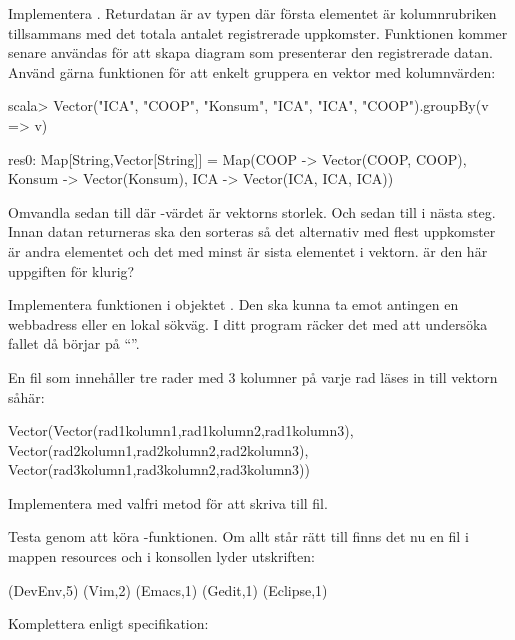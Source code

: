 \Subtask Implementera . Returdatan är av typen  där första elementet är kolumnrubriken tillsammans med det totala antalet registrerade uppkomster. Funktionen kommer senare användas för att skapa diagram som presenterar den registrerade datan. Använd gärna funktionen  för att enkelt gruppera en vektor med kolumnvärden:
\begin{REPLnonum}
scala> Vector("ICA", "COOP", "Konsum", "ICA", "ICA", "COOP").groupBy(v => v)

res0: Map[String,Vector[String]] = Map(COOP -> Vector(COOP, COOP),
                                       Konsum -> Vector(Konsum),
                                       ICA -> Vector(ICA, ICA, ICA))
\end{REPLnonum}
Omvandla sedan  till  där -värdet är vektorns storlek. Och sedan till  i nästa steg. Innan datan returneras ska den sorteras så det alternativ med flest uppkomster är andra elementet och det med minst är sista elementet i vektorn.
\TODO är den här uppgiften för klurig?

\Subtask Implementera funktionen  i objektet . Den ska kunna ta emot antingen en webbadress eller en lokal sökväg. I ditt program räcker det med att undersöka fallet då  börjar på ``''.

En fil som innehåller tre rader med 3 kolumner på varje rad läses in till vektorn såhär:
\begin{CodeSmall}[language=, ]
Vector(Vector(rad1kolumn1,rad1kolumn2,rad1kolumn3),
       Vector(rad2kolumn1,rad2kolumn2,rad2kolumn3),
       Vector(rad3kolumn1,rad3kolumn2,rad3kolumn3))
\end{CodeSmall}

\Subtask Implementera  med valfri metod för att skriva till fil.

\Subtask Testa  genom att köra -funktionen. Om allt står rätt till finns det nu en fil  i mappen resources och i konsollen lyder utskriften:
\begin{REPLnonum}
(DevEnv,5)
(Vim,2)
(Emacs,1)
(Gedit,1)
(Eclipse,1)
\end{REPLnonum}



\Task Komplettera  enligt specifikation:


